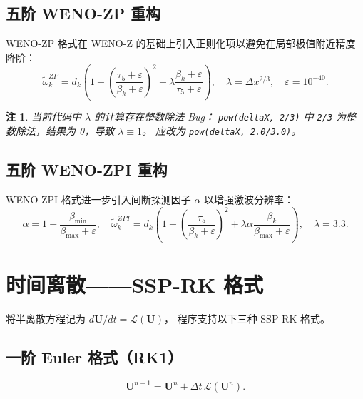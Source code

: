 \documentclass{article}
\newtheorem{remark}{注}
\numberwithin{equation}{section}
\begin{document}
\subsection{五阶 WENO-ZP 重构}

WENO-ZP 格式\cite{acker2016}在 WENO-Z 的基础上引入正则化项以避免在局部极值附近精度降阶：
\begin{equation}
    \tilde{\omega}_k^{ZP} = d_k\left(1 + \left(\frac{\tau_5 + \varepsilon}{\beta_k + \varepsilon}\right)^2
    + \lambda\frac{\beta_k + \varepsilon}{\tau_5 + \varepsilon}\right),\quad \lambda = \Delta x^{2/3},\quad \varepsilon = 10^{-40}.
\end{equation}

\begin{remark}
    当前代码中 $\lambda$ 的计算存在整数除法 Bug：
    \texttt{pow(deltaX, 2/3)} 中 \texttt{2/3} 为整数除法，结果为 0，导致 $\lambda \equiv 1$。
    应改为 \texttt{pow(deltaX, 2.0/3.0)}。
\end{remark}

\subsection{五阶 WENO-ZPI 重构}

WENO-ZPI 格式\cite{luo2021}进一步引入间断探测因子 $\alpha$ 以增强激波分辨率：
\begin{equation}
    \alpha = 1 - \frac{\beta_{\min}}{\beta_{\max} + \varepsilon},\quad
    \tilde{\omega}_k^{ZPI} = d_k\left(1 + \left(\frac{\tau_5}{\beta_k+\varepsilon}\right)^2
    + \lambda\alpha \frac{\beta_k}{\beta_{\max}+\varepsilon}\right),\quad \lambda = 3.3.
\end{equation}

\section{时间离散——SSP-RK 格式}

将半离散方程记为 $d\mathbf{U}/dt = \mathcal{L}(\mathbf{U})$，
程序支持以下三种 SSP-RK 格式\cite{gottlieb2001}。

\subsection{一阶 Euler 格式（RK1）}
\begin{equation}
    \mathbf{U}^{n+1} = \mathbf{U}^n + \Delta t\, \mathcal{L}(\mathbf{U}^n).
\end{equation}
\end{document}
